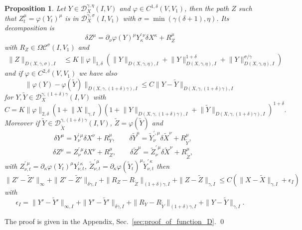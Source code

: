 \documentclass[a4paper,12pt,reqno]{amsproc}
\newcommand{\der}{\delta\!}
\newcommand{\DD}{\mathcal{D}}
\newcommand{\OCC}{\Omega \mathcal{C}}
\newcommand{\norm}[1]{\lVert #1\rVert}
\newtheorem{proposition}{Proposition}
\begin{document}
\begin{proposition}
\label{prop:functionD}
Let $Y \in \DD^{\gamma,\eta}_X(I,V)$ and  $\varphi \in C^{1,\delta}(V,V_1)$, then the path
 $Z$ such that $Z_t^\mu = \varphi(Y_t)^\mu$ is in $\DD^{\gamma,\sigma}_X(I,V_1)$ with
 $\sigma = \min(\gamma (\delta+1),\eta)$. Its decomposition is
$$
\der Z^\mu = \partial_\nu \varphi(Y)^\mu Y^{\prime\,\nu}_{\kappa} \der X^\kappa + R^\mu_Z 
$$
with $R_Z \in \OCC^\sigma(I,V_1)$ and
 \begin{equation}
\label{eq:bound_functionD}
   \begin{split}
\|Z\|_{D(X,\gamma,\sigma),I} & \le 
K \|\varphi\|_{1,\delta}(
\norm{Y}_{D(X,\gamma,\eta),I} + \norm{Y}^{1+\delta}_{D(X,\gamma,\eta),I} + \norm{Y}^{\sigma/\gamma}_{D(X,\gamma,\eta),I})
   \end{split}
 \end{equation}
and if $\varphi \in C^{2,\delta}(V,V_1)$ we have also
\begin{equation}
\label{eq:bound_lipshitz_functionD}
 \norm{\varphi(Y)-\varphi(\widetilde Y)}_{D(X,\gamma,(1+\delta)\gamma),I} \le C \norm{Y-\widetilde Y}_{D(X,\gamma,(1+\delta)\gamma),I} 
\end{equation}
for $Y,\widetilde Y \in \DD^{\gamma,(1+\delta)\gamma}_X(I,V)$
with 
$$
C =  K
 \norm{\varphi}_{2,\delta} (1+\norm{X}_{\gamma,I})
 (1+\norm{Y}_{D(X,\gamma,(1+\delta)\gamma),I}+\norm{\widetilde Y}_{D(X,\gamma,(1+\delta)\gamma),I})^{1+\delta}.
$$
Moreover if $\widetilde Y \in \DD_{\widetilde
  X}^{\gamma,(1+\delta)\gamma}(I,V)$, $\widetilde Z = \varphi(\widetilde
Y)$ and
$$
\der Y^\mu = Y^{\prime\,\mu}_{\nu} \der X^\nu + R^\mu_Y, \qquad 
\der \widetilde Y^\mu = \widetilde Y^{\prime,\mu}_{\nu} \der \widetilde X^\nu + R^\mu_{\widetilde Y}, \qquad 
$$
$$
\der Z^\mu = Z^{\prime\,\mu}_{\nu} \der X^\nu + R^\mu_Z, \qquad 
\der \widetilde Z^\mu = \widetilde Z^{\prime\,\mu}_{\nu} \der \widetilde X^\nu + R^\mu_{\widetilde Z}, \qquad 
$$
with $Z^{\prime\,\mu}_{\nu,t} = \partial_\kappa \varphi(Y_t)^{\mu}
Y^{\prime\,\kappa}_{\nu,t}$, $\widetilde Z^{\prime\,\mu}_{\nu,t} = \partial_\kappa
\varphi(\widetilde Y_t)^{\mu} \widetilde Y^{\prime\,\kappa}_{\nu,t}$ 
then
\begin{equation}
  \label{eq:function_difference}
\|Z'-\widetilde Z'\|_\infty + \|Z'-\widetilde Z'\|_{\delta\gamma,I} +
\|R_Z-R_{\widetilde Z}\|_{(1+\delta)\gamma,I} +\|Z-\widetilde Z\|_{\gamma,I} \le C
(\|X-\widetilde X\|_{\gamma,I} + \epsilon_I)  
\end{equation}
with
$$
\epsilon_I = \|Y'-\widetilde Y'\|_{\infty,I} + \|Y'-\widetilde Y'\|_{\delta\gamma,I} +
\|R_Y-R_{\widetilde Y}\|_{(1+\delta)\gamma,I} +\|Y-\widetilde Y\|_{\gamma,I}.
$$
\end{proposition}
\proof The proof is given in the Appendix,
Sec.~\ref{sec:proof_of_function_D}. \qed
\end{document}
